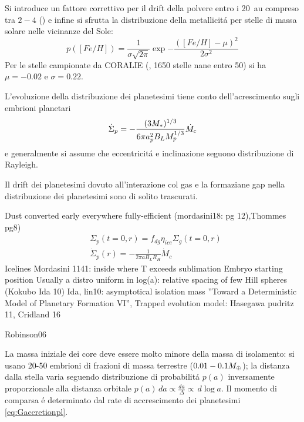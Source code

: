 Si introduce un fattore correttivo per il drift della polvere entro i \SI{20}{\astronomicalunit} compreso tra $2-4$ (\cite{kornet2004alternative}) e infine si sfrutta la distribuzione della metallicit\'a per stelle di massa solare nelle vicinanze del Sole:
\begin{equation}
p([Fe/H])=\frac{1}{\sigma\sqrt{2\pi}}\exp{-\frac{([Fe/H]-\mu)^2}{2\sigma^2}}
\end{equation}
Per le stelle campionate da CORALIE (\cite{udry2000coralie}, 1650 stelle nane entro \SI{50}{\parsec}) si ha $\mu=-0.02$ e $\sigma=0.22$.

L'evoluzione della distribuzione dei planetesimi tiene conto dell'acrescimento sugli embrioni planetari
\begin{equation}\dot{\Sigma}_p=-\frac{(3M_*)^{1/3}}{6\pi a_p^2B_LM_p^{1/3}}\dot{M}_c\end{equation}
e generalmente si assume che eccentricit\'a e inclinazione seguono distribuzione di Rayleigh.

Il drift dei planetesimi dovuto all'interazione col gas e la formaziane gap nella distribuzione dei planetesimi sono di solito trascurati.

\begin{workout}
	Dust converted early everywhere fully-efficient (mordasini18: pg 12),Thommes pg8)
	\begin{align*}
		&\Sigma_p(t=0,r)=f_{dg}\eta_{ice}\Sigma_g(t=0,r)\\
		&\dot{\Sigma}_p(r)=-\frac{1}{2\pi aB_LR_H}\dot{M}_c
	\end{align*}
	Icelines Mordasini 1141: inside where T exceeds sublimation
	{Embryo starting position}
	Usually a distro uniform in log(a): relative spacing of few Hill spheres (Kokubo Ida 10)
	Ida, lin10: asymptotical isolation mass ''Toward a Deterministic Model of Planetary Formation VI'',
	Trapped evolution model: Hasegawa pudritz 11, Cridland 16
\end{workout}

\begin{workout}
	Robinson06
\end{workout}


La massa iniziale dei core deve essere molto minore della massa di isolamento: si usano 20-50 embrioni di frazioni di massa terrestre ($0.01-0.1M_{\oplus}{}$); la distanza dalla stella varia seguendo distribuzione di probabilit\'a $p(a)$ inversamente proporzionale alla distanza orbitale $p(a)\,da\propto\frac{da}{\Delta}\propto\,d\log{a}$. Il momento di comparsa \'e determinato dal rate di accrescimento dei planetesimi \eqref{eq:Gaccretionpl}.


